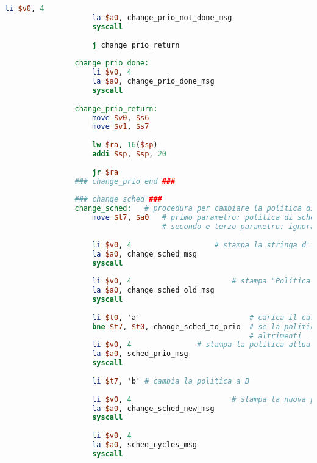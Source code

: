 \begin{center}
\begin{lstlisting}[language=mips, gobble=14, stepnumber=1]
                    li $v0, 4
                    la $a0, change_prio_not_done_msg
                    syscall
                    
                    j change_prio_return
                    
                change_prio_done:
                    li $v0, 4
                    la $a0, change_prio_done_msg
                    syscall
                
                change_prio_return:
                    move $v0, $s6
                    move $v1, $s7
                    
                    lw $ra, 16($sp)
                    addi $sp, $sp, 20
                    
                    jr $ra
                ### change_prio end ###
                
                ### change_sched ###
                change_sched:   # procedura per cambiare la politica di scheduling
                    move $t7, $a0   # primo parametro: politica di scheduling attuale
                                    # secondo e terzo parametro: ignorati
                    
                    li $v0, 4                   # stampa la stringa d'inizio del cambio della politica di scheduling
                    la $a0, change_sched_msg
                    syscall
                    
                    li $v0, 4                       # stampa "Politica di scheduling attuale:"
                    la $a0, change_sched_old_msg
                    syscall
                    
                    li $t0, 'a'                         # carica il carattere 'a'
                    bne $t7, $t0, change_sched_to_prio  # se la politica di scheduling attuale non è A, viene cambiata ad A
                                                        # altrimenti
                    li $v0, 4               # stampa la politica attuale (su PRIORITÀ)
                    la $a0, sched_prio_msg
                    syscall
                    
                    li $t7, 'b' # cambia la politica a B
                    
                    li $v0, 4                       # stampa la nuova politica (su ESECUZIONI RIMANENTI)
                    la $a0, change_sched_new_msg
                    syscall
                    
                    li $v0, 4
                    la $a0, sched_cycles_msg
                    syscall
                    

\end{lstlisting}
\end{center}
